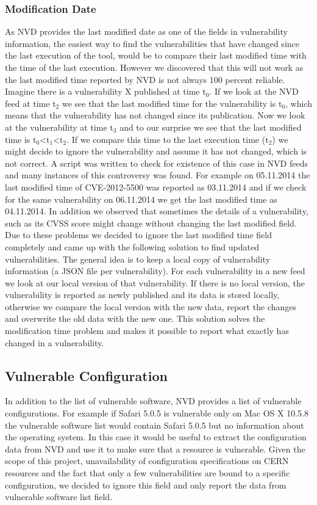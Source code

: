 \subsubsection{Modification Date}
As NVD provides the last modified date as one of the fields in vulnerability information, the easiest way to find the vulnerabilities that have changed since the last execution of the tool, would be to compare their last modified time with the time of the last execution. However we discovered that this will not work as the last modified time reported by NVD is not always 100 percent reliable. Imagine there is a vulnerability X published at time t$_{\text{0}}$. If we look at the NVD feed at time t$_{\text{2}}$ we see that the last modified time for the vulnerability is t$_{\text{0}}$, which means that the vulnerability has not changed since its publication. Now we look at the vulnerability at time t$_{\text{3}}$ and to our surprise we see that the last modified time is t$_{\text{0}}$<t$_{\text{1}}$<t$_{\text{2}}$. If we compare this time to the last execution time (t$_{\text{2}}$) we might decide to ignore the vulnerability and assume it has not changed, which is not correct. A script was written to check for existence of this case in NVD feeds and many instances of this controversy was found. For example on 05.11.2014 the last modified time of CVE-2012-5500 was reported as 03.11.2014 and if we check for the same vulnerability on 06.11.2014 we get the last modified time as 04.11.2014. In addition we observed that sometimes the details of a vulnerability, such as its CVSS score might change without changing the last modified field. Due to these problems we decided to ignore the last modified time field completely and came up with the following solution to find updated vulnerabilities. 
The general idea is to keep a local copy of vulnerability information (a JSON file per vulnerability). For each vulnerability in a new feed we look at our local version of that vulnerability. If there is no local version, the vulnerability is reported as newly published and its data is stored locally, otherwise we compare the local version with the new data, report the changes and overwrite the old data with the new one. 
This solution solves the modification time problem and makes it possible to report what exactly has changed in a vulnerability. 

\subsection{Vulnerable Configuration}
In addition to the list of vulnerable software, NVD provides a list of vulnerable configurations. For example if Safari 5.0.5 is vulnerable only on Mac OS X 10.5.8 the vulnerable software list would contain Safari 5.0.5 but no information about the operating system. In this case it would be useful to extract the configuration data from NVD and use it to make sure that a resource is vulnerable. Given the scope of this project, unavailability of configuration specifications on CERN resources and the fact that only a few vulnerabilities are bound to a specific configuration, we decided to ignore this field and only report the data from vulnerable software list field. 

